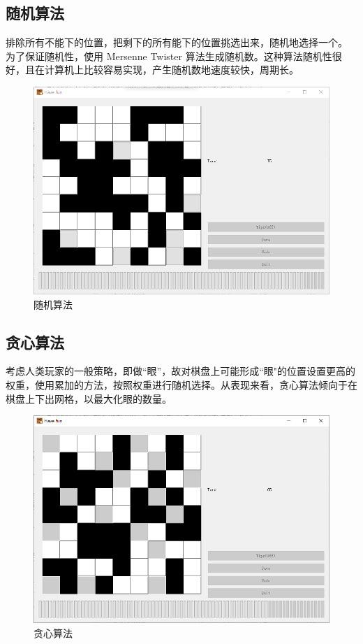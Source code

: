 \documentclass[UTF-8]{ctexart}
\begin{document}
		\subsection{随机算法}
		排除所有不能下的位置，把剩下的所有能下的位置挑选出来，随机地选择一个。
		为了保证随机性，使用 Mersenne Twister 算法生成随机数。这种算法随机性很好，且在计算机上比较容易实现，产生随机数地速度较快，周期长。
		\begin{figure}[H]
			\centering
			\includegraphics[width=13cm]{./file/random.png}
			\caption{随机算法}
		\end{figure}
		\subsection{贪心算法}
			考虑人类玩家的一般策略，即做“眼”，故对棋盘上可能形成“眼"的位置设置更高的权重，使用累加的方法，按照权重进行随机选择。从表现来看，贪心算法倾向于在棋盘上下出网格，以最大化眼的数量。
			\begin{figure}[H]
				\centering
				\includegraphics[width=13cm]{./file/greedy.png}
				\caption{贪心算法}
			\end{figure}
\end{document}
